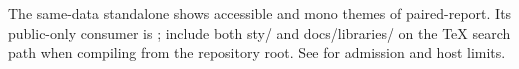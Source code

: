 The same-data standalone  shows accessible
and mono themes of paired-report. Its public-only consumer is
; include both sty/ and
docs/libraries/ on the TeX search path when compiling from the repository root.
See  for admission and host limits.
